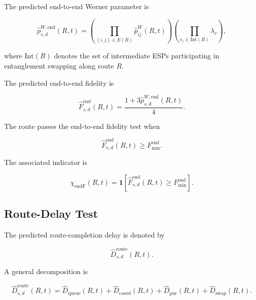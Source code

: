 The predicted end-to-end Werner parameter is

\begin{equation}
    \widehat{p}_{s,d}^{W,\mathrm{end}}(R,t)
    =
    \left(
    \prod_{
    (i,j)
    \in
    E(R)
    }
    \widehat{p}_{ij}^{W}(R,t)
    \right)
    \left(
    \prod_{
    v_r
    \in
    \mathrm{Int}(R)
    }
    \lambda_r
    \right),
\end{equation}

where $\mathrm{Int}(R)$ denotes the set of intermediate ESPs participating in entanglement swapping along route $R$.

The predicted end-to-end fidelity is

\begin{equation}
    \widehat{F}_{s,d}^{\mathrm{end}}(R,t)
    =
    \frac{
    1
    +
    3\widehat{p}_{s,d}^{W,\mathrm{end}}(R,t)
    }{4}.
\end{equation}

The route passes the end-to-end fidelity test when

\begin{equation}
    \widehat{F}_{s,d}^{\mathrm{end}}(R,t)
    \geq
    F_{\min}^{\mathrm{end}}.
\end{equation}

The associated indicator is

\begin{equation}
    \chi_{\mathrm{endF}}(R,t)
    =
    \mathbf{1}
    \left[
    \widehat{F}_{s,d}^{\mathrm{end}}(R,t)
    \geq
    F_{\min}^{\mathrm{end}}
    \right].
\end{equation}


\subsection{Route-Delay Test}

The predicted route-completion delay is denoted by

\begin{equation}
    \widehat{D}_{s,d}^{\mathrm{route}}(R,t).
\end{equation}

A general decomposition is

\begin{equation}
    \widehat{D}_{s,d}^{\mathrm{route}}(R,t)
    =
    \widehat{D}_{\mathrm{queue}}(R,t)
    +
    \widehat{D}_{\mathrm{coord}}(R,t)
    +
    \widehat{D}_{\mathrm{pur}}(R,t)
    +
    \widehat{D}_{\mathrm{swap}}(R,t).
\end{equation}

